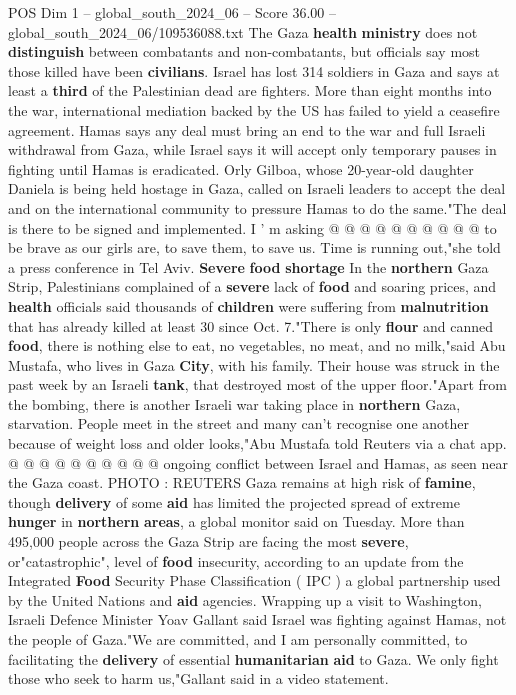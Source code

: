 \begin{textsample}{POS Dim 1 – global\_south\_2024\_06 – Score 36.00 – global\_south\_2024\_06/109536088.txt}
The Gaza \textbf{health} \textbf{ministry} does not \textbf{distinguish} between combatants and non-combatants, but officials say most those killed have been \textbf{civilians}.
Israel has lost 314 soldiers in Gaza and says at least a \textbf{third} of the Palestinian dead are fighters.
More than eight months into the war, international mediation backed by the US has failed to yield a ceasefire agreement.
Hamas says any deal must bring an end to the war and full Israeli withdrawal from Gaza, while Israel says it will accept only temporary pauses in fighting until Hamas is eradicated.
Orly Gilboa, whose 20-year-old daughter Daniela is being held hostage in Gaza, called on Israeli leaders to accept the deal and on the international community to pressure Hamas to do the same."The deal is there to be signed and implemented.
I ' m asking @ @ @ @ @ @ @ @ @ @ to be brave as our girls are, to save them, to save us.
Time is running out,"she told a press conference in Tel Aviv. \textbf{Severe} \textbf{food} \textbf{shortage} In the \textbf{northern} Gaza Strip, Palestinians complained of a \textbf{severe} lack of \textbf{food} and soaring prices, and \textbf{health} officials said thousands of \textbf{children} were suffering from \textbf{malnutrition} that has already killed at least 30 since Oct. 7."There is only \textbf{flour} and canned \textbf{food}, there is nothing else to eat, no vegetables, no meat, and no milk,"said Abu Mustafa, who lives in Gaza \textbf{City}, with his family.
Their house was struck in the past week by an Israeli \textbf{tank}, that destroyed most of the upper floor."Apart from the bombing, there is another Israeli war taking place in \textbf{northern} Gaza, starvation.
People meet in the street and many can't recognise one another because of weight loss and older looks,"Abu Mustafa told Reuters via a chat app. @ @ @ @ @ @ @ @ @ @ ongoing conflict between Israel and Hamas, as seen near the Gaza coast.
PHOTO : REUTERS Gaza remains at high risk of \textbf{famine}, though \textbf{delivery} of some \textbf{aid} has limited the projected spread of extreme \textbf{hunger} in \textbf{northern} \textbf{areas}, a global monitor said on Tuesday.
More than 495,000 people across the Gaza Strip are facing the most \textbf{severe}, or"catastrophic", level of \textbf{food} insecurity, according to an update from the Integrated \textbf{Food} Security Phase Classification ( IPC ) a global partnership used by the United Nations and \textbf{aid} agencies.
Wrapping up a visit to Washington, Israeli Defence Minister Yoav Gallant said Israel was fighting against Hamas, not the people of Gaza."We are committed, and I am personally committed, to facilitating the \textbf{delivery} of essential \textbf{humanitarian} \textbf{aid} to Gaza.
We only fight those who seek to harm us,"Gallant said in a video statement.

\end{textsample}
